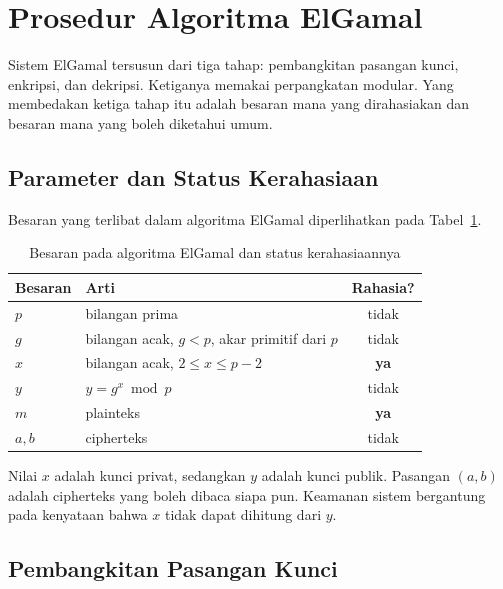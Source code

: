 \section{Prosedur Algoritma ElGamal}
\label{sec:prosedur-elgamal}

Sistem ElGamal tersusun dari tiga tahap: pembangkitan pasangan kunci, enkripsi,
dan dekripsi. Ketiganya memakai perpangkatan modular. Yang membedakan ketiga
tahap itu adalah besaran mana yang dirahasiakan dan besaran mana yang boleh
diketahui umum.

\subsection{Parameter dan Status Kerahasiaan}

Besaran yang terlibat dalam algoritma ElGamal diperlihatkan pada
Tabel~\ref{tab:parameter-elgamal}.

\begin{table}[htbp]
    \centering
    \begin{tabular}{@{}l l c@{}}
    \toprule
    \textbf{Besaran} & \textbf{Arti} & \textbf{Rahasia?} \\
    \midrule
    $p$          & bilangan prima                              & tidak \\
    $g$          & bilangan acak, $g < p$, akar primitif dari $p$ & tidak \\
    $x$          & bilangan acak, $2 \le x \le p-2$            & \textbf{ya} \\
    $y$          & $y = g^{x} \bmod p$                         & tidak \\
    $m$          & plainteks                                   & \textbf{ya} \\
    $a, b$       & cipherteks                                  & tidak \\
    \bottomrule
    \end{tabular}
    \caption{Besaran pada algoritma ElGamal dan status kerahasiaannya}
    \label{tab:parameter-elgamal}
\end{table}

Nilai $x$ adalah kunci privat, sedangkan $y$ adalah kunci publik. Pasangan
$(a, b)$ adalah cipherteks yang boleh dibaca siapa pun. Keamanan sistem
bergantung pada kenyataan bahwa $x$ tidak dapat dihitung dari $y$.

\subsection{Pembangkitan Pasangan Kunci}
\label{subsec:kunci-elgamal}

